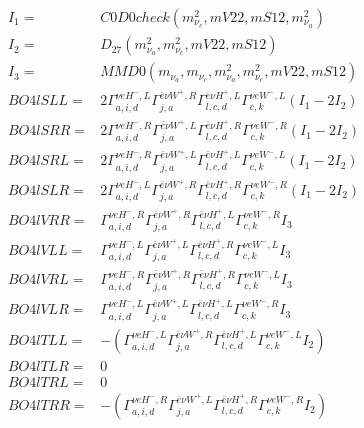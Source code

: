 \documentclass[A4,landscape]{article}
\begin{document}
\begin{align} 
I_1 = & C0D0check(m^2_{\nu_{{c}}}, mV22, mS12, m^2_{\nu_{{a}}}) \\ 
I_2 = & D_{27}(m^2_{\nu_{{a}}}, m^2_{\nu_{{c}}}, mV22, mS12) \\ 
I_3 = & MMD0(m_{\nu_{{a}}}, m_{\nu_{{c}}}, m^2_{\nu_{{a}}}, m^2_{\nu_{{c}}}, mV22, mS12) \\ 
  BO4lSLL= & 2  \Gamma^{\nu e H^- ,L}_{a, i, d} \Gamma^{\bar{e}\nu W^+ ,R}_{j, a} \Gamma^{\bar{e}\nu H^+,L}_{l, c, d} \Gamma^{\nu e W^-,L}_{c, k} (I_1 - 2 I_2) \\ 
  BO4lSRR= & 2  \Gamma^{\nu e H^- ,R}_{a, i, d} \Gamma^{\bar{e}\nu W^+ ,L}_{j, a} \Gamma^{\bar{e}\nu H^+,R}_{l, c, d} \Gamma^{\nu e W^-,R}_{c, k} (I_1 - 2 I_2) \\ 
  BO4lSRL= & 2  \Gamma^{\nu e H^- ,R}_{a, i, d} \Gamma^{\bar{e}\nu W^+ ,L}_{j, a} \Gamma^{\bar{e}\nu H^+,L}_{l, c, d} \Gamma^{\nu e W^-,L}_{c, k} (I_1 - 2 I_2) \\ 
  BO4lSLR= & 2  \Gamma^{\nu e H^- ,L}_{a, i, d} \Gamma^{\bar{e}\nu W^+ ,R}_{j, a} \Gamma^{\bar{e}\nu H^+,R}_{l, c, d} \Gamma^{\nu e W^-,R}_{c, k} (I_1 - 2 I_2) \\ 
  BO4lVRR= &  \Gamma^{\nu e H^- ,R}_{a, i, d} \Gamma^{\bar{e}\nu W^+ ,R}_{j, a} \Gamma^{\bar{e}\nu H^+,L}_{l, c, d} \Gamma^{\nu e W^-,R}_{c, k} I_3 \\ 
  BO4lVLL= &  \Gamma^{\nu e H^- ,L}_{a, i, d} \Gamma^{\bar{e}\nu W^+ ,L}_{j, a} \Gamma^{\bar{e}\nu H^+,R}_{l, c, d} \Gamma^{\nu e W^-,L}_{c, k} I_3 \\ 
  BO4lVRL= &  \Gamma^{\nu e H^- ,R}_{a, i, d} \Gamma^{\bar{e}\nu W^+ ,R}_{j, a} \Gamma^{\bar{e}\nu H^+,R}_{l, c, d} \Gamma^{\nu e W^-,L}_{c, k} I_3 \\ 
  BO4lVLR= &  \Gamma^{\nu e H^- ,L}_{a, i, d} \Gamma^{\bar{e}\nu W^+ ,L}_{j, a} \Gamma^{\bar{e}\nu H^+,L}_{l, c, d} \Gamma^{\nu e W^-,R}_{c, k} I_3 \\ 
  BO4lTLL= & -( \Gamma^{\nu e H^- ,L}_{a, i, d} \Gamma^{\bar{e}\nu W^+ ,R}_{j, a} \Gamma^{\bar{e}\nu H^+,L}_{l, c, d} \Gamma^{\nu e W^-,L}_{c, k} I_2) \\ 
  BO4lTLR= & 0 \\ 
  BO4lTRL= & 0 \\ 
  BO4lTRR= & -( \Gamma^{\nu e H^- ,R}_{a, i, d} \Gamma^{\bar{e}\nu W^+ ,L}_{j, a} \Gamma^{\bar{e}\nu H^+,R}_{l, c, d} \Gamma^{\nu e W^-,R}_{c, k} I_2) \\ 
\end{align} 
\end{document}
